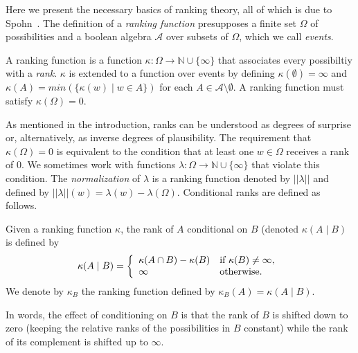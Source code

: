 \documentclass{llncs}
\begin{document}
Here we present the necessary basics of ranking theory, all of which is due to Spohn~\cite{DBLP:books/daglib/0035277}.
The definition of a \emph{ranking function} presupposes a finite set $\Omega$ of possibilities
	and a boolean algebra $\mathcal{A}$ over subsets of $\Omega$, which we call \emph{events}.

\begin{definition}
A ranking function is a function $\kappa: \Omega \rightarrow \mathbb{N} \cup \{\infty\}$ that associates every possibiltiy with a \emph{rank}.
$\kappa$ is extended to a function over events by defining $\kappa(\emptyset) = \infty$ and $\kappa(A) = min( \{ \kappa(w) \mid w \in A \} )$ for each $A \in \mathcal{A} \setminus \emptyset$.
A ranking function must satisfy $\kappa(\Omega) = 0$.
\end{definition}

As mentioned in the introduction, ranks can be understood as degrees of surprise or, alternatively, as inverse degrees of plausibility.
The requirement that $\kappa(\Omega) = 0$ is equivalent to the condition that at least one $w \in \Omega$ receives a rank of 0.
We sometimes work with functions $\lambda: \Omega \rightarrow \mathbb{N} \cup \{\infty\}$ that violate this condition.
The \emph{normalization} of $\lambda$ is a ranking function denoted by $|| \lambda ||$ and defined by $|| \lambda ||(w) = \lambda(w) - \lambda(\Omega)$.
Conditional ranks are defined as follows.

\begin{definition}\label{def:conditional}
Given a ranking function $\kappa$, the rank of $A$ conditional on $B$ (denoted $\kappa(A \mid B)$ is defined by
\[
                \kappa(A \mid B) = \left\{ \begin{array}{ll}
                 \kappa(A \cap B) - \kappa(B)& \mbox{if $\kappa(B) \not = \infty$,} \\
                 \infty & \mbox{otherwise.} \\
                   \end{array}
                  \right. \\
\] 
We denote by $\kappa_{B}$ the ranking function defined by $\kappa_{B}(A) = \kappa(A \mid B)$.
\end{definition}

In words, the effect of conditioning on $B$ is that the rank of $B$ is shifted down to zero (keeping the relative ranks of the possibilities in $B$ constant) 
	while the rank of its complement is shifted up to $\infty$.
\end{document}
